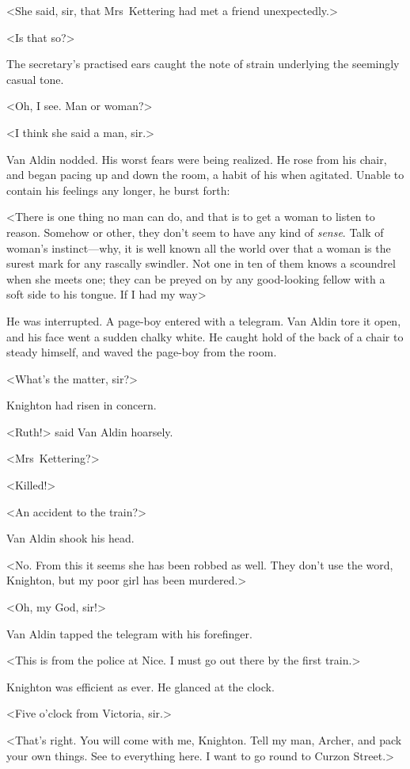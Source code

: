<She said, sir, that Mrs~Kettering had met a friend unexpectedly.>

<Is that so?>

The secretary's practised ears caught the note of strain underlying the seemingly casual tone.

<Oh, I see. Man or woman?>

<I think she said a man, sir.>

Van Aldin nodded. His worst fears were being realized. He rose from his chair, and began pacing up and down the room, a habit of his when agitated. Unable to contain his feelings any longer, he burst forth:

<There is one thing no man can do, and that is to get a woman to listen to reason. Somehow or other, they don't seem to have any kind of \emph{sense}. Talk of woman's instinct—why, it is well known all the world over that a woman is the surest mark for any rascally swindler. Not one in ten of them knows a scoundrel when she meets one; they can be preyed on by any good-looking fellow with a soft side to his tongue. If I had my way\longdash>

He was interrupted. A page-boy entered with a telegram. Van Aldin tore it open, and his face went a sudden chalky white. He caught hold of the back of a chair to steady himself, and waved the page-boy from the room.

<What's the matter, sir?>

Knighton had risen in concern.

<Ruth!> said Van Aldin hoarsely.

<Mrs~Kettering?>

<Killed!>

<An accident to the train?>

Van Aldin shook his head.

<No. From this it seems she has been robbed as well. They don't use the word, Knighton, but my poor girl has been murdered.>

<Oh, my God, sir!>

Van Aldin tapped the telegram with his forefinger.

<This is from the police at Nice. I must go out there by the first train.>

Knighton was efficient as ever. He glanced at the clock.

<Five o'clock from Victoria, sir.>

<That's right. You will come with me, Knighton. Tell my man, Archer, and pack your own things. See to everything here. I want to go round to Curzon Street.>

